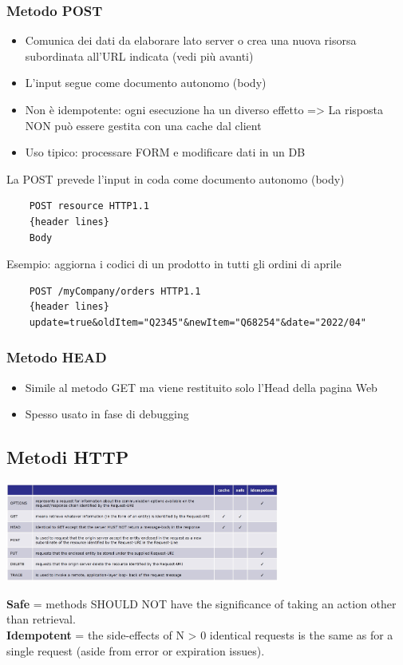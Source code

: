 \subsubsection{Metodo POST}
\begin{itemize}
    \item Comunica dei dati da elaborare lato server o crea una nuova risorsa subordinata all'URL indicata (vedi più avanti)
    \item L'input segue come documento autonomo (body)
    \item Non è idempotente: ogni esecuzione ha un diverso effetto => La risposta NON può essere gestita con una cache dal client
    \item Uso tipico: processare FORM e modificare dati in un DB
\end{itemize}
La POST prevede l'input in coda come documento autonomo (body)
\begin{verbatim}
    POST resource HTTP1.1
    {header lines}
    Body
\end{verbatim}
Esempio: aggiorna i codici di un prodotto in tutti gli ordini di aprile
\begin{verbatim}
    POST /myCompany/orders HTTP1.1
    {header lines}
    update=true&oldItem="Q2345"&newItem="Q68254"&date="2022/04"
\end{verbatim}
\subsubsection{Metodo HEAD}
\begin{itemize}
    \item Simile al metodo GET ma viene restituito solo l'Head della pagina Web
    \item Spesso usato in fase di debugging
\end{itemize}

\subsection{Metodi HTTP}
\begin{center}
    \includegraphics[width=0.675\textwidth]{img/MOC_metodi1.jpg}
\end{center}
\textbf{Safe} = methods SHOULD NOT have the significance of taking an action other than retrieval.
\\\textbf{Idempotent} = the side-effects of N > 0 identical requests is the same as for a single request (aside from error or expiration issues).

